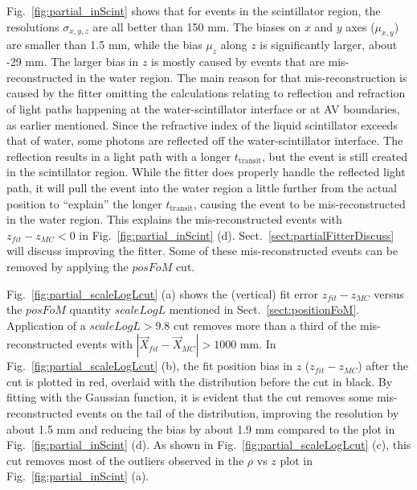 Fig.~\ref{fig:partial_inScint} shows that for events in the scintillator region, the resolutions $\sigma_{x,y,z}$ are all better than 150 mm. The biases on $x$ and $y$ axes ($\mu_{x,y}$) are smaller than 1.5 mm, while the bias $\mu_z$ along $z$ is significantly larger, about -29 mm. The larger bias in $z$ is mostly caused by events that are mis-reconstructed in the water region. The main reason for that mis-reconstruction is caused by the fitter omitting the calculations relating to reflection and refraction of light paths happening at the water-scintillator interface or at AV boundaries, as earlier mentioned. Since the refractive index of the liquid scintillator exceeds that of water, some photons are reflected off the water-scintillator interface. The reflection results in a light path with a longer $t_\mathrm{transit}$, but the event is still created in the scintillator region. While the fitter does properly handle the reflected light path, it will pull the event into the water region a little further from the actual position to ``explain'' the longer $t_\mathrm{transit}$, causing the event to be mis-reconstructed in the water region. This explains the mis-reconstructed events with $z_{fit}-z_{MC}<0$ in Fig.~\ref{fig:partial_inScint} (d). Sect.~\ref{sect:partialFitterDiscuss} will discuss improving the fitter. Some of these mis-reconstructed events can be removed by applying the $posFoM$ cut. 

Fig.~\ref{fig:partial_scaleLogLcut} (a) shows the (vertical) fit error $z_{fit}-z_{MC}$ versus the $posFoM$ quantity $scaleLogL$ mentioned in Sect.~\ref{sect:positionFoM}. Application of a $scaleLogL>9.8$ cut removes more than a third of the mis-reconstructed events with $|\vec{X}_{fit}-\vec{X}_{MC}|>1000$ mm. In Fig.~\ref{fig:partial_scaleLogLcut} (b), the fit position bias in $z$ ($z_{fit}-z_{MC}$) after the cut is plotted in red, overlaid with the distribution before the cut in black. By fitting with the Gaussian function, it is evident that the cut removes some mis-reconstructed events on the tail of the distribution, improving the resolution by about 1.5 mm and reducing the bias by about 1.9 mm compared to the plot in Fig.~\ref{fig:partial_inScint} (d). As shown in Fig.~\ref{fig:partial_scaleLogLcut} (c), this cut removes most of the outliers observed in the $\rho$ vs $z$ plot in Fig.~\ref{fig:partial_inScint} (a).

